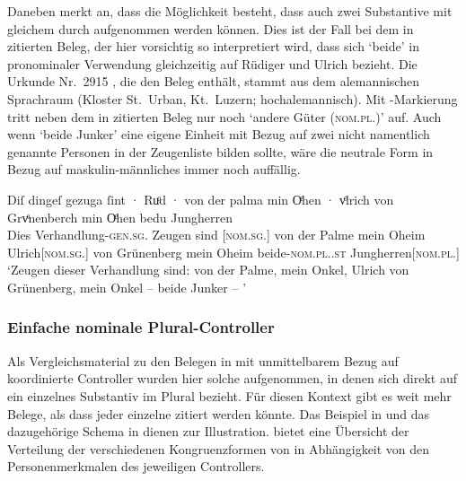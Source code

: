 \label{phsec:jungherren}
Daneben merkt \citet[384]{paul2007} an, dass die Möglichkeit besteht, dass auch
zwei Substantive mit gleichem  durch 
aufgenommen werden können. Dies ist der Fall bei dem in
 zitierten Beleg, der hier vorsichtig so
interpretiert wird, dass sich  `beide' in pronominaler Verwendung
gleichzeitig auf Rüdiger und Ulrich bezieht. Die Urkunde Nr.~2915
\autocite[213,14--42]{cao4}, die den Beleg enthält, stammt aus dem
alemannischen Sprachraum (Kloster
St.~Urban, Kt.~Luzern; hochalemannisch). Mit
-Markierung tritt neben dem in  zitierten
Beleg nur noch  `andere Güter (\textsc{nom.pl.\NeutI})'
\autocites(Nr.~2915)[213.27]{cao4} auf. Auch wenn  `beide
Junker' eine eigene Einheit mit Bezug auf zwei nicht namentlich genannte
Personen in der Zeugenliste bilden sollte, wäre die neutrale Form  in
Bezug auf maskulin-männliches  immer noch auffällig.

\begin{exe}
\ex \label{ex:beid2coordncao1_2}
	\gll Diſ dingeſ gezuga ſint · Ruͦd · von der palma
			min Oͤhen · vͦlrich von Grvͤnenberch min Oͤhen bedu Jungherren \\
		Dies Verhandlung-\textsc{gen.sg.\NeutI} Zeugen sind {}
		[\textsc{nom.sg.\MascM}] {} von der Palme mein Oheim {}
		Ulrich[\textsc{nom.sg.\MascM}] von Grünenberg mein Oheim
		beide-\textsc{nom.pl.\NeutM.st} Jungherren[\textsc{nom.pl.\MascM}] \\
	\trans `Zeugen dieser Verhandlung sind:  von der Palme,
		mein Onkel, Ulrich von Grünenberg, mein Onkel -- beide Junker --
		\textelp{}'
			\parencites(Nr.~2915, Kl.~St.~Urban, Kt.~Luzern, 1298)[213,33--35]{cao4}
\end{exe}

\subsubsection{Einfache nominale Plural-Controller}
\label{subsubsec:persplnp}

Als Vergleichsmaterial zu den Belegen in  mit
unmittelbarem Bezug auf koordinierte Controller wurden hier solche aufgenommen,
in denen sich  direkt auf ein einzelnes Substantiv
im Plural bezieht. Für diesen Kontext gibt es weit mehr Belege, als dass jeder
einzelne zitiert werden könnte. Das Beispiel in  und das
dazugehörige Schema in  dienen zur Illustration.
 bietet eine Übersicht der
Verteilung der verschiedenen Kongruenz\-formen
von  in Abhängigkeit von den Personenmerkmalen des jeweiligen
Controllers.

